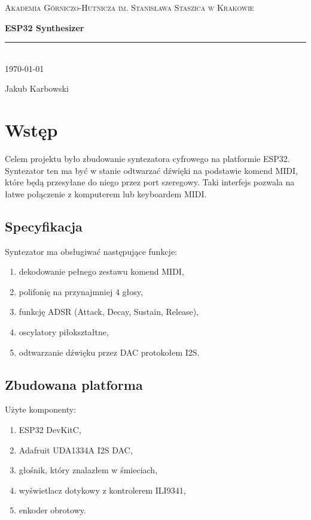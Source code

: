 \documentclass[12pt,a4paper,openright,dvipsnames]{mwart}
\newcommand{\vtitle}{ESP32 Synthesizer}
\newcommand{\vauthors}{
    Jakub Karbowski
}
\begin{document}
\begin{titlepage}
    \centering

    \textsc{Akademia Górniczo-Hutnicza im. Stanisława Staszica w Krakowie}


    {\LARGE\bfseries \vtitle\\}
    \rule{3in}{0.4pt} \\
    \today


    \large\vauthors


\end{titlepage}



\section{Wstęp}

Celem projektu było zbudowanie syntezatora cyfrowego na
platformie ESP32. Syntezator ten ma być w stanie odtwarzać
dźwięki na podstawie komend MIDI, które będą przesyłane
do niego przez port szeregowy.
Taki interfejs pozwala na łatwe połączenie z komputerem lub
keyboardem MIDI.


\subsection{Specyfikacja}

Syntezator ma obsługiwać następujące funkcje:
\begin{enumerate}
    \item dekodowanie pełnego zestawu komend MIDI,
    \item polifonię na przynajmniej 4 głosy,
    \item funkcję ADSR (Attack, Decay, Sustain, Release),
    \item oscylatory piłokształtne,
    \item odtwarzanie dźwięku przez DAC protokołem I2S.
\end{enumerate}


\subsection{Zbudowana platforma}

Użyte komponenty:
\begin{enumerate}
    \item ESP32 DevKitC,
    \item Adafruit UDA1334A I2S DAC,
    \item głośnik, który znalazłem w śmieciach,
    \item wyświetlacz dotykowy z kontrolerem ILI9341,
    \item enkoder obrotowy.
\end{enumerate}
\end{document}

